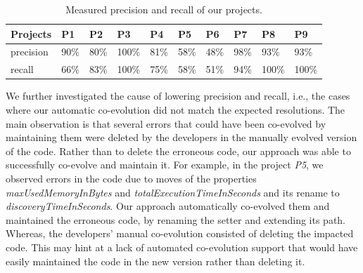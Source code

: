 	\begin{table}[t]
	\caption{Measured precision and recall of our projects.}
	\label{table:correctness}
	\centering
		\begin{tabular}{
				@{\hskip3pt}l@{\hskip3pt}l@{\hskip3pt}l@{\hskip3pt}l@{\hskip3pt}l@{\hskip3pt}l@{\hskip3pt}l@{\hskip3pt}l@{\hskip3pt}l@{\hskip3pt}l@{\hskip3pt}}
			\toprule 
			Projects & P1 & P2 & P3 & P4 & P5 & P6 & P7 & P8 & P9 \\ \midrule%
			precision & 90\%  & 80\%   & 100\%    & 81\%   & 58\%   & 48\%   & 98\%   & 93\%   & 93\% \\ \midrule
			recall & 66\%  & 83\%   & 100\%    & 75\%   & 58\%   & 51\%   & 94\%   & 100\%   & 100\% \\
			\bottomrule
		\end{tabular}
	\end{table}
	
	
	
	We further investigated the cause of lowering precision and recall, i.e., the cases where our automatic co-evolution did not match the expected resolutions. 
	The main observation is that several errors that could have been co-evolved by maintaining them were deleted by the developers in the manually evolved version of the code. Rather than to delete the erroneous code, our approach was able to successfully co-evolve and maintain it. 
	For example, in the project \emph{P5}, we observed errors in the code due to moves of the properties \emph{maxUsedMemoryInBytes} and \emph{totalExecutionTimeInSeconds} and its rename to \emph{discoveryTimeInSeconds}. 
	Our approach automatically co-evolved them and maintained the erroneous code, by renaming the setter and extending its path. Whereas, the developers' manual co-evolution consisted of deleting the impacted code. This may hint at a lack of automated co-evolution support that would have easily maintained the code in the new version rather than deleting it.  
	
